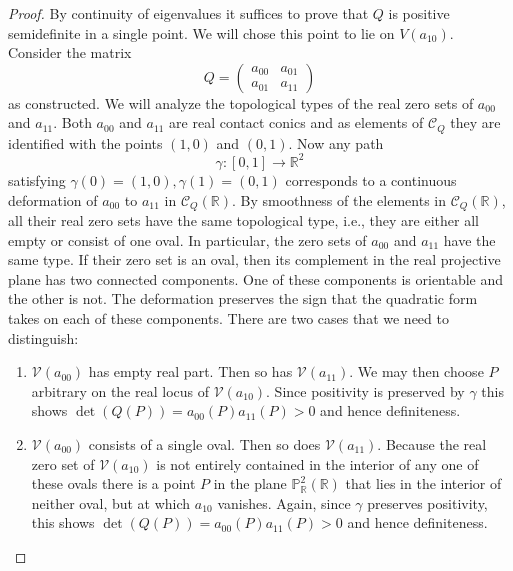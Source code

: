 \documentclass[a4paper,10pt]{amsart}
\theoremstyle{definition}
\theoremstyle{plain}
\newcommand{\cC}{{\mathcal C}}
\newcommand{\cV}{{\mathcal V}}
\newcommand{\R}{{\mathbb R}}
\newcommand{\pp}{\mathbb{P}}
\begin{document}
\begin{proof}
    By continuity of eigenvalues it suffices to prove that $Q$ is positive semidefinite in a single point. We will chose this point to lie on $V(a_{10})$. Consider the matrix
    \begin{equation*}
        Q = \begin{pmatrix}
            a_{00} & a_{01} \\
            a_{01} & a_{11}
        \end{pmatrix}
    \end{equation*}
    as constructed. We will analyze the topological types of the real zero sets of $a_{00}$ and $a_{11}$. Both $a_{00}$ and $a_{11}$ are real contact conics and as elements of $\cC_Q$ they are identified with the points $(1,0)$ and $(0,1)$. Now any path
    \begin{equation*}
        \gamma\colon [0,1] \to \R^2
    \end{equation*}
    satisfying $\gamma(0) = (1,0), \gamma(1) = (0,1)$ corresponds to a continuous deformation of $a_{00}$ to $a_{11}$ in $\cC_Q(\R)$. By smoothness of the elements in $\cC_Q(\R)$, all their real zero sets have the same topological type, i.e., they are either all empty or consist of one oval. In particular, the zero sets of $a_{00}$ and $a_{11}$ have the same type. If their zero set is an oval, then its complement in the real projective plane has two connected components. One of these components is orientable and the other is not. The deformation preserves the sign that the quadratic form takes on each of these components. There are two cases that we need to distinguish:
    \begin{enumerate}
        \item $\cV(a_{00})$ has empty real part. Then so has $\cV(a_{11})$. We may then choose $P$ arbitrary on the real locus of $\cV(a_{10})$. Since positivity is preserved by $\gamma$ this shows $\det(Q(P)) = a_{00}(P)a_{11}(P) > 0$ and hence definiteness.

        \item $\cV(a_{00})$ consists of a single oval. Then so does $\cV(a_{11})$. Because the real zero set of $\cV(a_{10})$ is not entirely contained in the interior of any one of these ovals there is a point $P$ in the plane $\pp^2_\R(\R)$ that lies in the interior of neither oval, but at which $a_{10}$ vanishes. Again, since $\gamma$ preserves positivity, this shows $\det(Q(P)) = a_{00}(P)a_{11}(P) > 0$ and hence definiteness.\qedhere
    \end{enumerate}
\end{proof}
\end{document}

